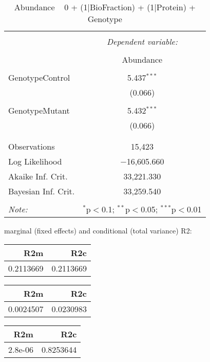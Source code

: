 \documentclass[11pt]{report}
\begin{document}
\begin{table}[!htbp] \centering 
  \caption{Abundance ~ 0 + (1|BioFraction) + (1|Protein) + Genotype} 
  \label{} 
\begin{tabular}{@{\extracolsep{5pt}}lc} 
\\[-1.8ex]\hline 
\hline \\[-1.8ex] 
 & \multicolumn{1}{c}{\textit{Dependent variable:}} \\ 
\cline{2-2} 
\\[-1.8ex] & Abundance \\ 
\hline \\[-1.8ex] 
 GenotypeControl & 5.437$^{***}$ \\ 
  & (0.066) \\ 
  & \\ 
 GenotypeMutant & 5.432$^{***}$ \\ 
  & (0.066) \\ 
  & \\ 
\hline \\[-1.8ex] 
Observations & 15,423 \\ 
Log Likelihood & $-$16,605.660 \\ 
Akaike Inf. Crit. & 33,221.330 \\ 
Bayesian Inf. Crit. & 33,259.540 \\ 
\hline 
\hline \\[-1.8ex] 
\textit{Note:}  & \multicolumn{1}{r}{$^{*}$p$<$0.1; $^{**}$p$<$0.05; $^{***}$p$<$0.01} \\ 
\end{tabular} 
\end{table} 
marginal (fixed effects) and conditional (total variance) R2:

\begin{tabular}{r|r}
\hline
R2m & R2c\\
\hline
0.2113669 & 0.2113669\\
\hline
\end{tabular}

\begin{tabular}{r|r}
\hline
R2m & R2c\\
\hline
0.0024507 & 0.0230983\\
\hline
\end{tabular}

\begin{tabular}{r|r}
\hline
R2m & R2c\\
\hline
2.8e-06 & 0.8253644\\
\hline
\end{tabular}
\end{document}

